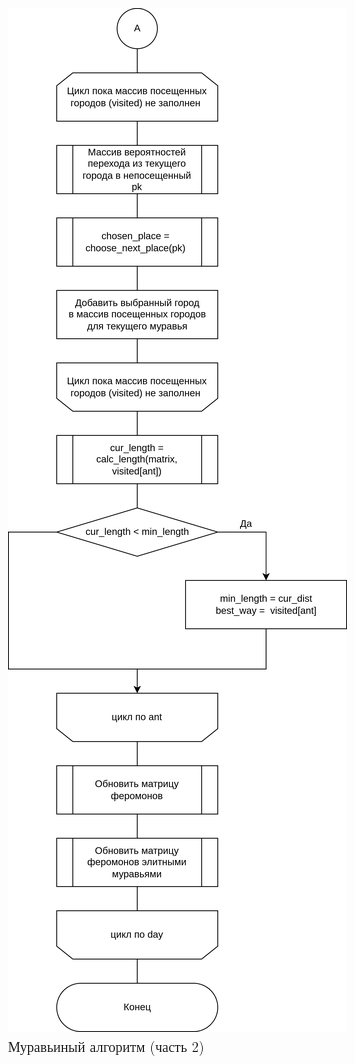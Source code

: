 \begin{figure}[h]
	\centering
	\includegraphics[height=0.9\textheight]{imgs/ant2.drawio}
	\caption{Муравьиный алгоритм  (часть 2)}
	\label{fig:ants-2}
\end{figure}

